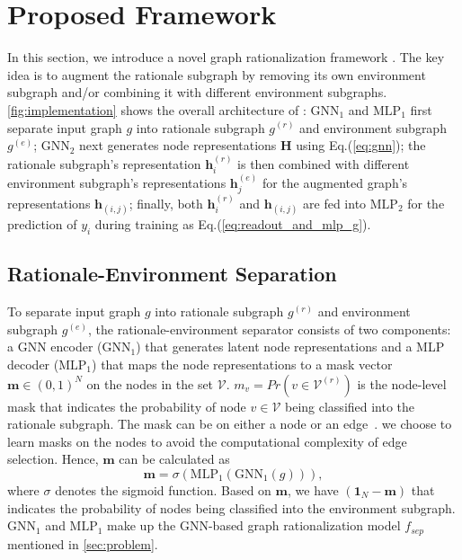 \documentclass[sigconf]{acmart}
\begin{document}
\section{Proposed Framework}
\label{sec:method}
In this section, we introduce a novel graph rationalization framework \method. The key idea is to augment the rationale subgraph by removing its own environment subgraph and/or combining it with different environment subgraphs. \cref{fig:implementation} shows the overall architecture of \method:
$\text{GNN}_1$ and $\text{MLP}_1$ first separate input graph $g$ into rationale subgraph $g^{(r)}$ and environment subgraph $g^{(e)}$;
$\text{GNN}_2$ next generates node representations $\mathbf{H}$ using Eq.(\ref{eq:gnn}); 
the rationale subgraph's representation $\mathbf{h}^{(r)}_i$ is then combined with different environment subgraph's representations $\mathbf{h}^{(e)}_j$ for the augmented graph's representations $\mathbf{h}_{(i,j)}$; 
finally, both $\mathbf{h}^{(r)}_i$ and $\mathbf{h}_{(i,j)}$ are fed into $\text{MLP}_2$ for the prediction of $y_i$ during training as Eq.(\ref{eq:readout_and_mlp_g}).

\subsection{Rationale-Environment Separation} 
\label{sec:gnnsep}
To separate input graph $g$ into rationale subgraph $g^{(r)}$ and environment subgraph $g^{(e)}$, the rationale-environment separator consists of two components: a GNN encoder ($\text{GNN}_1$) that generates latent node representations and a MLP decoder ($\text{MLP}_1$) that maps the node representations to a mask vector $\mathbf{m} \in {(0, 1)}^{N}$ on the nodes in the set $\mathcal{V}$. $m_v = Pr(v \in \mathcal{V}^{(r)})$ is the node-level mask that indicates the probability of node $v \in \mathcal{V}$ being classified into the rationale subgraph.
The mask can be on either a node or an edge~\cite{wu2022discovering}. we choose to learn masks on the nodes to avoid the computational complexity of edge selection. Hence, $\mathbf{m}$ can be calculated as
\begin{equation}
\label{eq:separator_enc_dec}
    \mathbf{m} = \sigma(\text{MLP}_1(\text{GNN}_1(g))),
\end{equation}
where $\sigma$ denotes the sigmoid function. Based on $\mathbf{m}$, we have $(\mathbf{1}_{N} - \mathbf{m})$ that indicates the probability of nodes being classified into the environment subgraph. $\text{GNN}_1$ and $\text{MLP}_1$ make up the GNN-based graph rationalization model $f_{sep}$ mentioned in \cref{sec:problem}.
\end{document}
